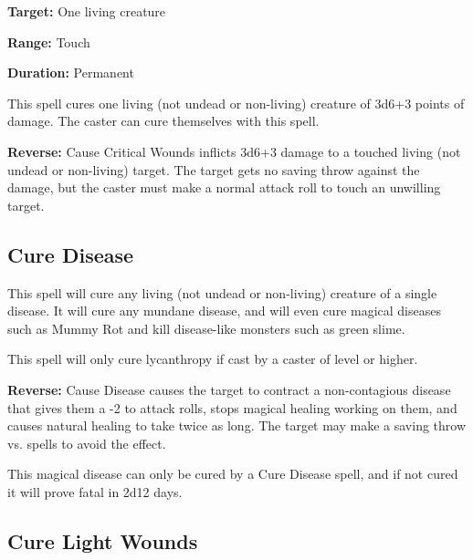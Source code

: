 \begin{multicols*}{2}
{\textbf{Target:} One living creature

\textbf{Range:} Touch

\textbf{Duration:} Permanent}

This spell cures one living (not undead or non-living) creature of 3d6+3 points of damage. The caster can cure themselves with this spell.

\textbf{Reverse:} \hypertarget{spell:Cause Critical Wounds}{Cause Critical Wounds} inflicts 3d6+3 damage to a touched living (not undead or non-living) target. The target gets no saving throw against the damage, but the caster must make a normal attack roll to touch an unwilling target.

\subsection{Cure Disease}\label{spell:Cure Disease}

This spell will cure any living (not undead or non-living) creature of a single disease. It will cure any mundane disease, and will even cure magical diseases such as Mummy Rot and kill disease-like monsters such as green slime.

This spell will only cure lycanthropy if cast by a caster of  level or higher.

\textbf{Reverse:} \hypertarget{spell:Cause Disease}{Cause Disease} causes the target to contract a non-contagious disease that gives them a -2 to attack rolls, stops magical healing working on them, and causes natural healing to take twice as long. The target may make a saving throw vs. spells to avoid the effect.

This magical disease can only be cured by a Cure Disease spell, and if not cured it will prove fatal in 2d12 days.

\subsection{Cure Light Wounds}\label{spell:Cure Light Wounds}
\end{multicols*}
